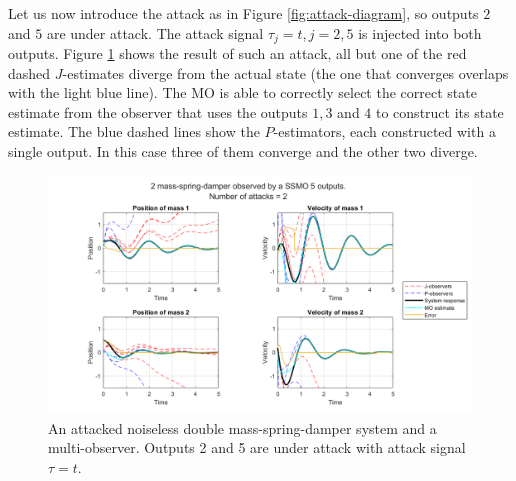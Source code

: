 Let us now introduce the attack as in Figure \ref{fig:attack-diagram}, so outputs $2$ and $5$ are under attack. The attack signal $\tau_j=t,j=2,5$ is injected into both outputs. Figure \ref{fig:attacked-system-plot} shows the result of such an attack, all but one of the red dashed $J$-estimates diverge from the actual state (the one that converges overlaps with the light blue line). The MO is able to correctly select the correct state estimate from the observer that uses the outputs $1,3$ and $4$ to construct its state estimate. The blue dashed lines show the $P$-estimators, each constructed with a single output. In this case three of them converge and the other two diverge. 

\begin{figure}[h]
    \centering
    \includegraphics[width=\linewidth]{report/Figures/symplot_5o2a}
    \caption{An attacked noiseless double mass-spring-damper system and a multi-observer. Outputs 2 and 5 are under attack with attack signal $\tau=t$.}
    \label{fig:attacked-system-plot}
\end{figure}